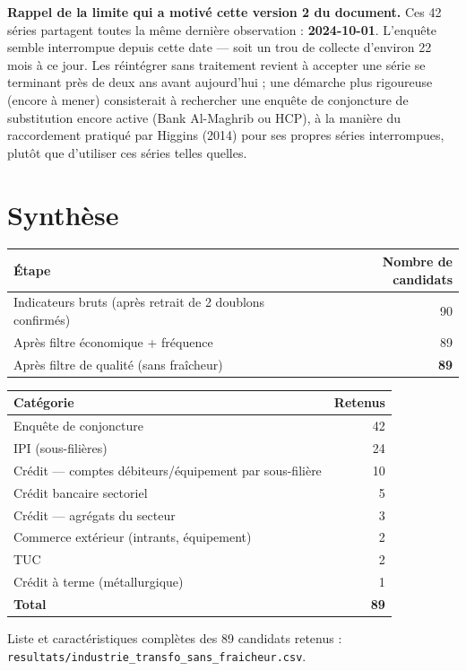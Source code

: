 \documentclass[11pt,a4paper]{article}
\begin{document}
\begin{alertebox}
\textbf{Rappel de la limite qui a motivé cette version 2 du document.} Ces 42 séries partagent toutes la même dernière observation : \textbf{2024-10-01}. L'enquête semble interrompue depuis cette date --- soit un trou de collecte d'environ 22 mois à ce jour. Les réintégrer sans traitement revient à accepter une série se terminant près de deux ans avant aujourd'hui ; une démarche plus rigoureuse (encore à mener) consisterait à rechercher une enquête de conjoncture de substitution encore active (Bank Al-Maghrib ou HCP), à la manière du raccordement pratiqué par Higgins (2014) pour ses propres séries interrompues, plutôt que d'utiliser ces séries telles quelles.
\end{alertebox}

\section{Synthèse}

\begin{fichebox}
\begin{center}
\begin{tabular}{lr}
\toprule
\textbf{Étape} & \textbf{Nombre de candidats} \\
\midrule
Indicateurs bruts (après retrait de 2 doublons confirmés) & 90 \\
Après filtre économique + fréquence & 89 \\
Après filtre de qualité (sans fraîcheur) & \textbf{89} \\
\bottomrule
\end{tabular}
\end{center}
\end{fichebox}

\begin{center}
\small
\begin{tabular}{lr}
\toprule
\textbf{Catégorie} & \textbf{Retenus} \\
\midrule
Enquête de conjoncture & 42 \\
IPI (sous-filières) & 24 \\
Crédit --- comptes débiteurs/équipement par sous-filière & 10 \\
Crédit bancaire sectoriel & 5 \\
Crédit --- agrégats du secteur & 3 \\
Commerce extérieur (intrants, équipement) & 2 \\
TUC & 2 \\
Crédit à terme (métallurgique) & 1 \\
\midrule
\textbf{Total} & \textbf{89} \\
\bottomrule
\end{tabular}
\end{center}

\begin{fichierbox}
Liste et caractéristiques complètes des 89 candidats retenus : \texttt{resultats/industrie\_transfo\_sans\_fraicheur.csv}.
\end{fichierbox}
\end{document}

